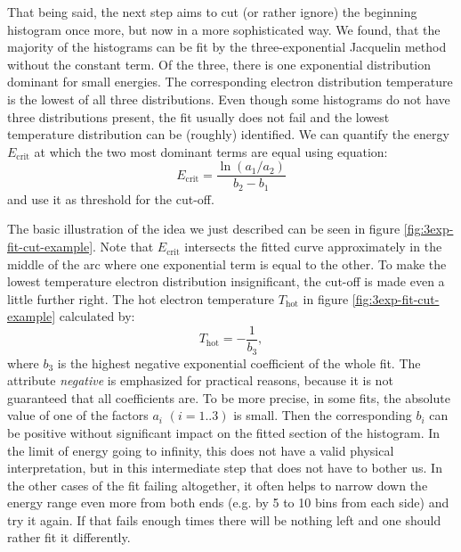 That being said, the next step aims to cut (or rather ignore) the beginning histogram once more, but now in a more sophisticated way. We found, that the majority of the histograms can be fit by the three-exponential Jacquelin method without the constant term. Of the three, there is one exponential distribution dominant for small energies. The corresponding electron distribution temperature is the lowest of all three distributions. Even though some histograms do not have three distributions present, the fit usually does not fail and the lowest temperature distribution can be (roughly) identified. We can quantify the energy $E_{\mathrm{crit}}$ at which the two most dominant terms are equal using equation:
\begin{equation}
	E_{\mathrm{crit}} = \frac{\ln{\left(a_1/a_2\right)}}{b_2-b_1}
\end{equation}
and use it as threshold for the cut-off. 

The basic illustration of the idea we just described can be seen in figure \ref{fig:3exp-fit-cut-example}. Note that $E_{\mathrm{crit}}$ intersects the fitted curve approximately in the middle of the arc where one exponential term is equal to the other. To make the lowest temperature electron distribution insignificant, the cut-off is made even a little further right. The hot electron temperature $T_\mathrm{hot}$ in figure \ref{fig:3exp-fit-cut-example} calculated by:
\begin{equation}
	T_{\mathrm{hot}} = -\frac{1}{b_3},
\end{equation}
where $b_3$ is the highest negative exponential coefficient of the whole fit. The attribute \textit{negative} is emphasized for practical reasons, because it is not guaranteed that all coefficients are. To be more precise, in some fits, the absolute value of one of the factors $a_i$ $(i=1..3)$ is small. Then the corresponding $b_i$ can be positive without significant impact on the fitted section of the histogram. In the limit of energy going to infinity, this does not have a valid physical interpretation, but in this intermediate step that does not have to bother us. In the other cases of the fit failing altogether, it often helps to narrow down the energy range even more from both ends (e.g. by 5 to 10 bins from each side) and try it again. If that fails enough times there will be nothing left and one should rather fit it differently.
	
